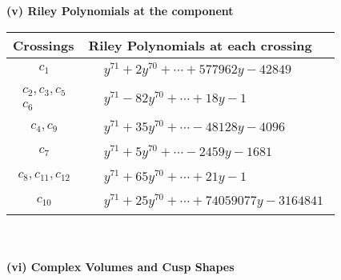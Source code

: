 \documentclass[1p]{elsarticle_modified}
\theoremstyle{definition}
\begin{document}
\newpage\renewcommand{\arraystretch}{1}
\flushleft \textbf{(v) Riley Polynomials at the component}\newline \\
\begin{tabular}{m{50pt}|m{274pt}}
Crossings & \hspace{64pt}Riley Polynomials at each crossing \\
\hline $$\begin{aligned}c_{1}\end{aligned}$$&$\begin{aligned}
&y^{71}+2 y^{70}+\cdots+577962 y-42849
\end{aligned}$\\
\hline $$\begin{aligned}c_{2},c_{3},c_{5}\\c_{6}\end{aligned}$$&$\begin{aligned}
&y^{71}-82 y^{70}+\cdots+18 y-1
\end{aligned}$\\
\hline $$\begin{aligned}c_{4},c_{9}\end{aligned}$$&$\begin{aligned}
&y^{71}+35 y^{70}+\cdots-48128 y-4096
\end{aligned}$\\
\hline $$\begin{aligned}c_{7}\end{aligned}$$&$\begin{aligned}
&y^{71}+5 y^{70}+\cdots-2459 y-1681
\end{aligned}$\\
\hline $$\begin{aligned}c_{8},c_{11},c_{12}\end{aligned}$$&$\begin{aligned}
&y^{71}+65 y^{70}+\cdots+21 y-1
\end{aligned}$\\
\hline $$\begin{aligned}c_{10}\end{aligned}$$&$\begin{aligned}
&y^{71}+25 y^{70}+\cdots+74059077 y-3164841
\end{aligned}$\\
\hline
\end{tabular}\\~\\
\newpage\flushleft \textbf{(vi) Complex Volumes and Cusp Shapes}
\end{document}
